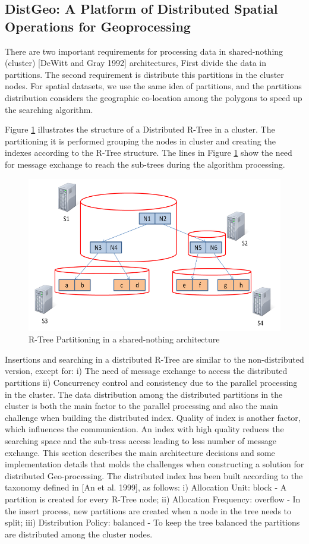 \subsection{DistGeo: A Platform of Distributed Spatial Operations for Geoprocessing}

There are two important requirements for processing data in shared-nothing (cluster) [DeWitt and Gray 1992] architectures, First divide the data in partitions. The second requirement is distribute this partitions in the cluster nodes. For spatial datasets, we use the same idea of partitions, and the partitions distribution considers the geographic co-location among the polygons to speed up the searching algorithm.

Figure \ref{fig:partitioning} illustrates the structure of a Distributed R-Tree in a cluster. The partitioning it is performed grouping the nodes in cluster and creating the indexes according to the R-Tree structure. The lines in Figure \ref{fig:partitioning} show the need for message exchange to reach the sub-trees during the algorithm processing.

\begin{figure}[ht]
\centering
\includegraphics[width=.5\textwidth]{r-tree-partiotioning.png}
\caption{R-Tree Partitioning in a shared-nothing architecture}
\label{fig:partitioning}
\end{figure}

Insertions and searching in a distributed R-Tree are similar to the non-distributed version, except for:
i) The need of message exchange to access the distributed partitions
ii) Concurrency control and consistency due to the parallel processing in the cluster.
	The data distribution among the distributed partitions in the cluster is both the main factor to the parallel processing and also the main challenge when building the distributed index.
	Quality of index is another factor, which influences the communication. An index with high quality reduces the searching space and the sub-tress access leading to less number of message exchange.
	This section describes the main architecture decisions and some implementation details that molds the challenges when constructing a solution for distributed Geo-processing.
	The distributed index has been built according to the taxonomy defined in [An et al. 1999], as follows: i) Allocation Unit: block - A partition is created for every R-Tree node; ii) Allocation Frequency: overflow - In the insert process, new partitions are created when a node in the tree needs to split; iii) Distribution Policy: balanced - To keep the tree balanced the partitions are distributed among the cluster nodes.
	
